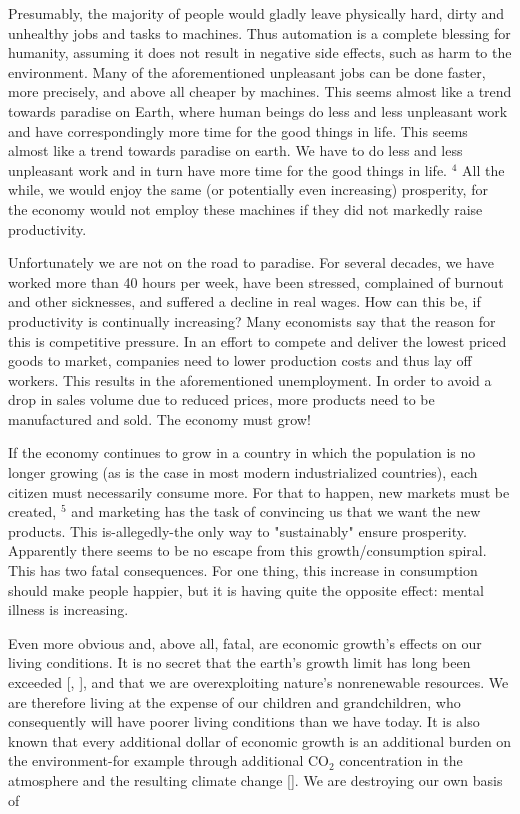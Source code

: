 \documentclass[10pt]{article}
\begin{document}
Presumably, the majority of people would gladly leave physically hard, dirty and unhealthy jobs and tasks to machines. Thus automation is a complete blessing for humanity, assuming it does not result in negative side effects, such as harm to the environment. Many of the aforementioned unpleasant jobs can be done faster, more precisely, and above all cheaper by machines. This seems almost like a trend towards paradise on Earth, where human beings do less and less unpleasant work and have correspondingly more time for the good things in life. This seems almost like a trend towards paradise on earth. We have to do less and less unpleasant work and in turn have more time for the good things in life. ${ }^{4}$ All the while, we would enjoy the same (or potentially even increasing) prosperity, for the economy would not employ these machines if they did not markedly raise productivity.

Unfortunately we are not on the road to paradise. For several decades, we have worked more than 40 hours per week, have been stressed, complained of burnout and other sicknesses, and suffered a decline in real wages. How can this be, if productivity is continually increasing? Many economists say that the reason for this is competitive pressure. In an effort to compete and deliver the lowest priced goods to market, companies need to lower production costs and thus lay off workers. This results in the aforementioned unemployment. In order to avoid a drop in sales volume due to reduced prices, more products need to be manufactured and sold. The economy must grow!

If the economy continues to grow in a country in which the population is no longer growing (as is the case in most modern industrialized countries), each citizen must necessarily consume more. For that to happen, new markets must be created, ${ }^{5}$ and marketing has the task of convincing us that we want the new products. This is-allegedly-the only way to "sustainably" ensure prosperity. Apparently there seems to be no escape from this growth/consumption spiral. This has two fatal consequences. For one thing, this increase in consumption should make people happier, but it is having quite the opposite effect: mental illness is increasing.

Even more obvious and, above all, fatal, are economic growth's effects on our living conditions. It is no secret that the earth's growth limit has long been exceeded [\cite{meadows1972grenzen}, \cite{randers2012_2052}], and that we are overexploiting nature's nonrenewable resources. We are therefore living at the expense of our children and grandchildren, who consequently will have poorer living conditions than we have today. It is also known that every additional dollar of economic growth is an additional burden on the environment-for example through additional $\mathrm{CO}_{2}$ concentration in the atmosphere and the resulting climate change [\cite{paech2016befreiung}]. We are destroying our own basis of
\end{document}
